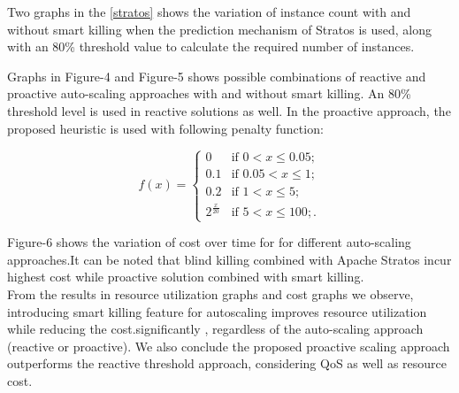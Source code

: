 Two graphs in the \ref{stratos} shows the variation of instance count with and without smart killing when the prediction mechanism of Stratos is used, along with an 80\% threshold value to calculate the required number of instances.

Graphs in Figure-4  and Figure-5 shows possible combinations of reactive and proactive auto-scaling approaches with and without smart killing. An 80\% threshold level is used in reactive solutions as well. In the proactive approach, the proposed heuristic is used with following penalty function:

$$f(x) = \begin{cases} 
0 & \text{if $0 < x \le 0.05$}; \\
0.1 & \text{if $0.05 < x \le 1$}; \\
0.2 & \text{if $1 < x \le 5$};\\
2^{\frac{x}{20}} & \text{if $5 < x \le 100$};.\end{cases} $$


Figure-6 shows the variation of cost over time for for different auto-scaling approaches.It can be noted that blind killing combined with Apache Stratos incur highest cost while proactive solution combined with smart killing.\\

From the results in resource utilization graphs and cost graphs we observe, introducing smart killing feature for autoscaling  improves resource utilization while reducing the cost.significantly , regardless of the auto-scaling approach (reactive or proactive). We also conclude the proposed proactive scaling approach outperforms the reactive threshold approach, considering QoS as well as resource cost.